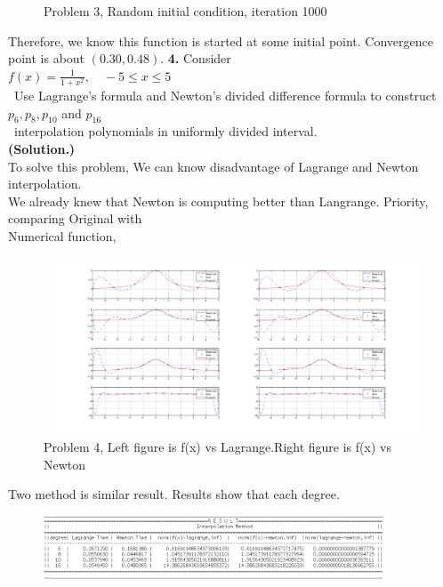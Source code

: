 \documentclass[10pt]{article}
\begin{document}
\begin{flushleft}
\begin{figure}[!h]
\begin{center}
		\caption{Problem 3, Random initial condition, iteration 1000 }
		\end{center}
	\end{figure}
	\quad\: Therefore, we know this function is started at some initial point. Convergence point is about $(0.30,0.48)$.
	\newpage
	\textbf{4.} Consider\\
	\;\;\;
	\qquad \qquad \qquad \qquad\qquad\qquad\qquad\qquad\qquad $f(x)=\frac{1}{1+x^2},\quad -5 \leq x \leq 5$\\
	\;\;\;
	\quad\, Use Lagrange's formula and Newton's divided difference formula to construct $p_6,p_8,p_{10}$ and $p_{16}$ \\
	\quad\, interpolation polynomials in uniformly divided interval.\\
	\;\;\;
	\quad\: \textbf{(Solution.)} \\
	\quad\: To solve this problem, We can know disadvantage of Lagrange and Newton interpolation.\\
	\quad\: We already knew that Newton is computing better than Langrange. Priority, comparing Original with \\
	\quad\: Numerical function,\\
	\begin{figure}[!h]
		\centering
		\begin{center}
		\includegraphics[width=1\textwidth]{4.png}
		\caption{Problem 4, Left figure is f(x) vs Lagrange.Right figure is f(x) vs Newton }
		\end{center}
	\end{figure}
	\quad\: Two method is similar result. Results show that each degree.\\
	\begin{figure}[!h]
		\centering
		\begin{center}
		\includegraphics[width=0.9\textwidth]{4-r.png}

\end{center}
\end{figure}
\end{flushleft}
\end{document}
